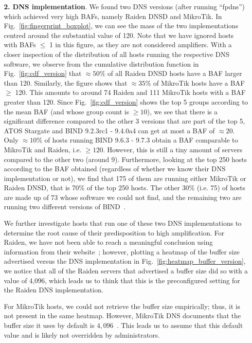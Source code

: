  \noindent \textbf{2. DNS implementation}. We found two DNS versions (after running ``fpdns'') which achieved very high BAFs, namely Raiden DNSD and MikroTik. In Fig.~\ref{fig:fingerprint_boxplot}, we can see the mass of the two implementations centred around the substantial value of 120. Note that we have ignored hosts with BAFs $\leq$ 1 in this figure, as they are not considered amplifiers. With a closer inspection of the distribution of all hosts running the respective DNS software, we observe from the cumulative distribution function in Fig.~\ref{fig:cdf_version} that $\approx 50\%$ of all Raiden DNSD hosts have a BAF larger than 120. Similarly, the figure shows that $\approx 35\%$ of MikroTik hosts have a BAF $\geq$ 120. This amounts to around 74 Raiden and 111 MikroTik hosts with a BAF greater than 120. Since Fig.~\ref{fig:cdf_version} shows the top 5 groups according to the mean BAF (and whose group count is $\geq 10$), we see that there is a significant difference compared to the other 3 versions that are part of the top 5, ATOS Stargate and BIND 9.2.3rc1 - 9.4.0a4 can get at most a BAF of $\approx 20$. Only $\approx 10\%$ of hosts running BIND 9.6.3 - 9.7.3 obtain a BAF comparable to MikroTik and Raiden, i.e. $\geq 120$. However, this is still a tiny amount of servers compared to the other two (around 9). Furthermore, looking at the top 250 hosts according to the BAF obtained (regardless of whether we know their DNS implementation or not), we find that 175 of them are running either MikroTik or Raiden DNSD, that is 70\% of the top 250 hosts. The other 30\% (i.e. 75) of hosts are made up of 73 whose software we could not find, and the remaining two are running two different versions of BIND~\cite{bind}. 


 We further investigate hosts that run one of these two DNS implementations to determine the root cause of their predisposition to high amplification. For Raiden, we have not been able to reach a meaningful conclusion using information from their website~\cite{raiden_dnsd}; however, plotting a heatmap of the buffer size advertised versus the DNS implementation in Fig.~\ref{fig:heatmap_buffer_version}, we notice that all of the Raiden servers that advertised a buffer size did so with a value of 4,096, which leads us to think that this is the preconfigured setting for the Raiden DNS implementation. 


 For MikroTik hosts, we could not retrieve the buffer size empirically; thus, it is not present in the same heatmap. However, MikroTik DNS documents that the buffer size it uses by default is $4,096$~\cite{mikrotik_forum}. This leads us to assume that this default value and is likely not overridden by administrators. 


